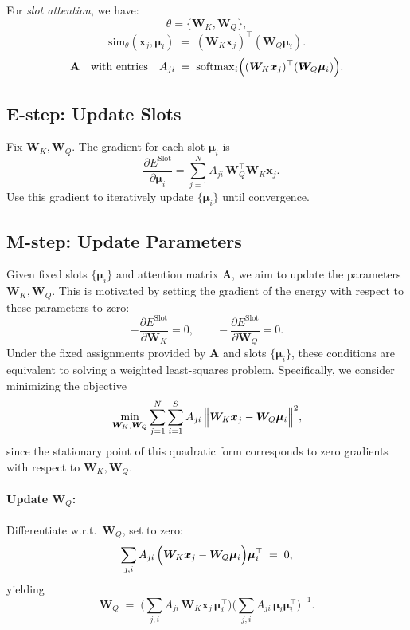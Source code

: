\documentclass{article}
\begin{document}
    For \emph{slot attention}, we have:
    \[
    \theta = \{\bm{W}_K,\bm{W}_Q\},
    \] 
    \[
    \mathrm{sim}_\theta(\bm{x}_j,\bm{\mu}_i)
    \;=\;
    (\bm{W}_K\bm{x}_j)^\top(\bm{W}_Q\bm{\mu}_i).
    \]
    \[
    \mathbf{A} 
    \quad\text{with entries}\quad 
    A_{ji}
    \;=\;
    \mathrm{softmax}_i\Bigl(
    (\bm{W}_K\bm{x}_j)^\top(\bm{W}_Q\bm{\mu}_i)
    \Bigr).
    \]
    
    \subsection*{E-step: Update Slots}
    Fix \(\bm{W}_K,\bm{W}_Q\). The gradient for each slot \(\bm{\mu}_i\) is
    \[
    -\frac{\partial E^{\mathrm{Slot}}}{\partial \bm{\mu}_i}
    =
    \sum_{j=1}^N
    A_{ji}\,
    \bm{W}_Q^\top\bm{W}_K\bm{x}_j.
    \]
    Use this gradient to iteratively update \(\{\bm{\mu}_i\}\) until convergence.
    
    \subsection*{M-step: Update Parameters}
    
    Given fixed slots \(\{\bm{\mu}_i\}\) and attention matrix \(\mathbf{A}\), we aim to update the parameters \(\bm{W}_K,\bm{W}_Q\). This is motivated by setting the gradient of the energy with respect to these parameters to zero:
    \[
    -\frac{\partial E^{\mathrm{Slot}}}{\partial \bm{W}_K} = 0,
    \qquad
    -\frac{\partial E^{\mathrm{Slot}}}{\partial \bm{W}_Q} = 0.
    \]
    Under the fixed assignments provided by \(\mathbf{A}\) and slots \(\{\bm{\mu}_i\}\), these conditions are equivalent to solving a weighted least-squares problem. Specifically, we consider minimizing the objective
    \[
    \min_{\bm{W}_K,\bm{W}_Q}
    \sum_{j=1}^N\sum_{i=1}^S
    A_{ji}\,
    \Bigl\|\bm{W}_K\bm{x}_j - \bm{W}_Q\bm{\mu}_i\Bigr\|^2,
    \]
    since the stationary point of this quadratic form corresponds to zero gradients with respect to \(\bm{W}_K,\bm{W}_Q\).


    \paragraph{Update \(\bm{W}_Q\):}
    Differentiate w.r.t.\ \(\bm{W}_Q\), set to zero:
    \[
    \sum_{j,i}A_{ji}\,
    \Bigl(\bm{W}_K\bm{x}_j - \bm{W}_Q\bm{\mu}_i\Bigr)
    \bm{\mu}_i^\top
    \;=\;0,
    \]
    yielding
    \[
    \bm{W}_Q
    \;=\;
    \Biggl(
    \sum_{j,i}A_{ji}\,
    \bm{W}_K\bm{x}_j\,\bm{\mu}_i^\top
    \Biggr)
    \Biggl(\sum_{j,i}A_{ji}\,
    \bm{\mu}_i\bm{\mu}_i^\top
    \Biggr)^{-1}.
    \]
\end{document}
